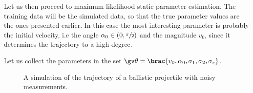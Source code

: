Let us then proceed to maximum likelihood static parameter estimation. The training
data will be the simulated data, so that the true parameter values are the ones presented
earlier. In this case the most interesting parameter is probably the initial velocity,
i.e the angle $\alpha_0\in(0,\sfrac{\pi}{2})$ and the magnitude $v_0$, since it determines
the trajectory to a high degree.

 
Let us collect the parameters in the set $\Th=\brac{v_0,\alpha_0,\sigma_1,\sigma_2,\sigma_r}$.


\begin{figure}[htb]%
    \centering%
	\caption{A simulation of the trajectory of a ballistic projectile with noisy measurements.}
	\label{fig:ballistic2D_simulation}
 \end{figure}



